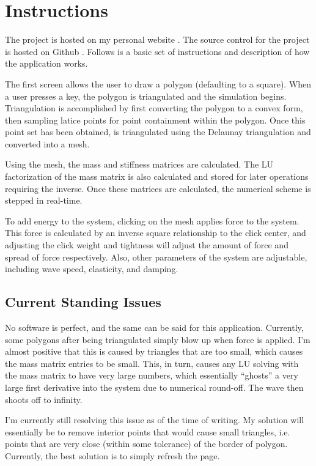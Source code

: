\section{Instructions}
The project is hosted on my personal website \cite{hosted_site}. The source control for the project is hosted on Github
\cite{github}. Follows is a basic set of instructions and description of how the application works.

The first screen allows the user to draw a polygon (defaulting to a square). When a user presses a key, the polygon is
triangulated and the simulation begins. Triangulation is accomplished by first converting the polygon to a convex form,
then sampling latice points for point containment within the polygon. Once this point set has been obtained, is
triangulated using the Delaunay triangulation and converted into a mesh.

Using the mesh, the mass and stiffness matrices are calculated. The LU factorization of the mass matrix is also
calculated and stored for later operations requiring the inverse. Once these matrices are calculated, the numerical
scheme is stepped in real-time.

To add energy to the system, clicking on the mesh applies force to the system. This force is calculated by an inverse
square relationship to the click center, and adjusting the click weight and tightness will adjust the amount of force
and spread of force respectively. Also, other parameters of the system are adjustable, including wave speed,
elasticity, and damping.

\subsection{Current Standing Issues}
No software is perfect, and the same can be said for this application. Currently, some polygons after being triangulated
simply blow up when force is applied. I'm almost positive that this is caused by triangles that are too small, which
causes the mass matrix entries to be small. This, in turn, causes any LU solving with the mass matrix to have very large
numbers, which essentially ``ghosts'' a very large first derivative into the system due to numerical round-off. The wave
then shoots off to infinity.

I'm currently still resolving this issue as of the time of writing. My solution will essentially be to remove interior
points that would cause small triangles, i.e. points that are very close (within some tolerance) of the border of
polygon. Currently, the best solution is to simply refresh the page.
